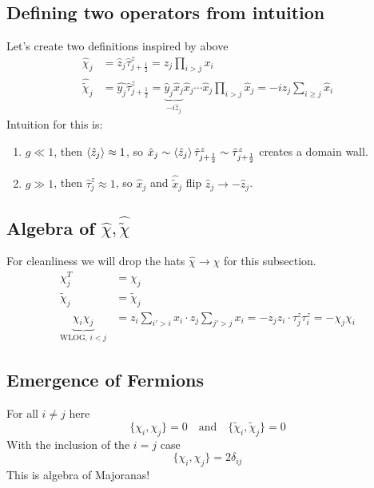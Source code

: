 \documentclass[letterpaper]{article}
\begin{document}
\subsection*{Defining two operators from intuition}

Let's create two definitions inspired by above
\begin{align}
\hat	\chi _j &= \hat{z}_j	\hat{\tau}_{j + \frac{1}{2}}^{z} = 
	z_j \prod_{i > j} x_i  \\ 
\hat{\tilde{\chi}}_j &= \hat{y_j} \hat{\tau}_{j + \frac{1}{2}}^{z} = \underbrace{\hat{y}_j \hat{x}_j}_{- i \hat{z}_j} \hat{x}_j \cdots \hat{x}_j \prod_{i > j} \hat{x}_j = -i z_j \sum_{i \ge j}^{} \hat{x}_i
\end{align}
Intuition for this is: 
\begin{enumerate}
	\item $g\ll 1$, then $\braket{\hat{z}_j } \approx 1$, so $\hat{x}_j \sim \braket{\hat{z}_j } \hat{\tau}_{j + \frac{1}{2}} ^{z} \sim \hat{\tau}_{j+\frac{1}{2}}^{z}$ creates a domain wall. 
	\item $g \gg 1$, then $\hat{\tau}_j ^{z} \approx 1$, so $\hat{x}_j$ and $\hat{\tilde{x}}_j$ flip $\hat{z}_j \to  - \hat{z}_j$. 
\end{enumerate}

\subsection*{Algebra of $\hat{\chi}, \hat{\tilde{\chi}}$ }
For cleanliness we will drop the hats $\hat{\chi} \to  \chi $ for this subsection. 
\begin{align*}
\chi_j ^{T} &= \chi_j \\
\tilde{\chi}_j &= \tilde{\chi} _j\\ 
\underbrace{\chi_i \chi_j}_{\text{WLOG, }i < j} &= z_i \sum_{i' > i }^{} x_i \cdot z_j \sum_{j' > j}^{} x_i = - z_j z_i \cdot \tau_j^{z} \tau_i	^{z} = - \chi_j \chi_i 
\end{align*}

\subsection*{Emergence of Fermions} 
For all $i \neq  j$ here 
\[
	\{ \chi_i, \chi_j \} = 0  \quad  \text{and} \quad 
	\{ \tilde\chi_i, \tilde\chi_j \} = 0  
\]
With the inclusion of the $i = j$ case 
\[
	\{ \chi_i , \chi_j \}  = 2 \delta_{ij} 
\]
This is algebra of Majoranas! 
\end{document}
